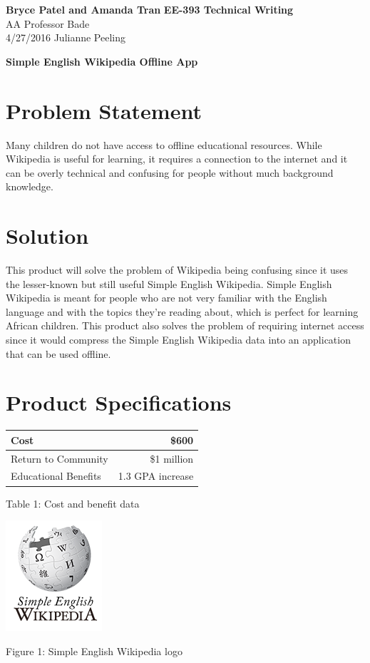 \documentclass[a4paper, 11pt]{article}
\begin{document}
\noindent
\large\textbf{Bryce Patel and Amanda Tran} \hfill \textbf{EE-393 Technical Writing} \\
\normalsize AA \hfill Professor Bade \\
4/27/2016 \hfill Julianne Peeling




\begin{center}{\Large\textbf{Simple English Wikipedia Offline App}}\end{center}
\section*{Problem Statement}
Many children do not have access to offline educational resources. While Wikipedia is useful for learning, it requires a connection to the internet and it can be overly technical and confusing for people without much background knowledge.

\section*{Solution}
This product will solve the problem of Wikipedia being confusing since it uses the lesser-known but still useful Simple English Wikipedia. Simple English Wikipedia is meant for people who are not very familiar with the English language and with the topics they’re reading about, which is perfect for learning African children. This product also solves the problem of requiring internet access since it would compress the Simple English Wikipedia data into an application that can be used offline.

\section*{Product Specifications}

\begin{center}
  \begin{tabular}{ | l | r |}
    \hline
    Cost & \$600 \\ \hline
    Return to Community & \$1 million \\ \hline
    Educational Benefits & 1.3 GPA increase \\
    \hline
  \end{tabular}
\end{center}
\begin{center}Table 1: Cost and benefit data\end{center}
\begin{center}\includegraphics{Wikipedia-logo-simple}\end{center}
\begin{center}Figure 1: Simple English Wikipedia logo\end{center}
\end{document}
